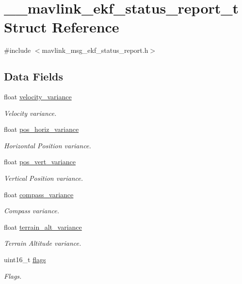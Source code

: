 \hypertarget{struct____mavlink__ekf__status__report__t}{\section{\+\_\+\+\_\+mavlink\+\_\+ekf\+\_\+status\+\_\+report\+\_\+t Struct Reference}
\label{struct____mavlink__ekf__status__report__t}
}


{\ttfamily \#include $<$mavlink\+\_\+msg\+\_\+ekf\+\_\+status\+\_\+report.\+h$>$}

\subsection*{Data Fields}
\begin{DoxyCompactItemize}
\item 
float \hyperlink{struct____mavlink__ekf__status__report__t_a2fa2b8dd778cf5e6a7781d6e322d9620}{velocity\+\_\+variance}
\begin{DoxyCompactList}\small\item\em Velocity variance. \end{DoxyCompactList}\item 
float \hyperlink{struct____mavlink__ekf__status__report__t_af4d8559715c480694f6d7d3e59a48fb5}{pos\+\_\+horiz\+\_\+variance}
\begin{DoxyCompactList}\small\item\em Horizontal Position variance. \end{DoxyCompactList}\item 
float \hyperlink{struct____mavlink__ekf__status__report__t_ab123603c4b46dd148d0b6fc757697f3b}{pos\+\_\+vert\+\_\+variance}
\begin{DoxyCompactList}\small\item\em Vertical Position variance. \end{DoxyCompactList}\item 
float \hyperlink{struct____mavlink__ekf__status__report__t_acf0c873470e324668f9b8f8fb9d5f361}{compass\+\_\+variance}
\begin{DoxyCompactList}\small\item\em Compass variance. \end{DoxyCompactList}\item 
float \hyperlink{struct____mavlink__ekf__status__report__t_a1be3f210685c23d4d46ac2173c433521}{terrain\+\_\+alt\+\_\+variance}
\begin{DoxyCompactList}\small\item\em Terrain Altitude variance. \end{DoxyCompactList}\item 
uint16\+\_\+t \hyperlink{struct____mavlink__ekf__status__report__t_a23f18ed770c00dcb37a9032242b4d051}{flags}
\begin{DoxyCompactList}\small\item\em Flags. \end{DoxyCompactList}\end{DoxyCompactItemize}


